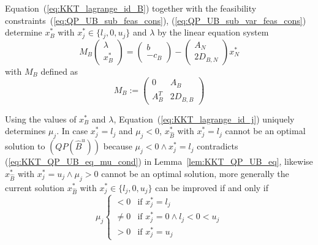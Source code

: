 \documentclass[a4paper]{article}
\begin{document}
Equation~(\ref{eq:KKT_lagrange_id_B}) together with the feasibility
constraints~(\ref{eq:QP_UB_sub_feas_cons}), (\ref{eq:QP_UB_sub_var_feas_cons})
determine $x_{B}^{*}$ with $x_{j}^{*} \in \{l_{j}, 0, u_{j}\}$ and $\lambda$ by
the linear equation system
\begin{equation}
M_{B}
\left(
\begin{array}{c}
\lambda \\
\hline
x_{B}^{*}
\end{array}
\right)
=
\left(
\begin{array}{c}
b \\
\hline
-c_{B}
\end{array}
\right)
-
\left(
\begin{array}{c}
A_{N} \\
\hline
2D_{B, N}
\end{array}
\right)
x_{N}^{*}
\end{equation}
with $M_{B}$ defined as
\begin{equation}
M_{B}:=
\left(
\begin{array}{c|c}
0 & A_{B} \\
\hline
A_{B}^{T} & 2D_{B,B}
\end{array}
\right)
\end{equation}

Using the values of $x_{B}^{*}$ and $\lambda$,
Equation~(\ref{eq:KKT_lagrange_id_j}) uniquely determines $\mu_{j}$.
In case $x_{j}^{*}=l_{j}$ and $\mu_{j} < 0$, $x_{\hat{B}}^{*}$ with
$x_{j}^{*}=l_{j}$ cannot
be an optimal solution to $(QP(\hat{B}^{u}))$ because
$\mu_{j}<0 \wedge x_{j}^{*}=l_{j}$ contradicts (\ref{eq:KKT_QP_UB_eq_mu_cond})
in Lemma~\ref{lem:KKT_QP_UB_eq}, likewise $x_{\hat{B}}^{*}$ with
$x_{j}^{*}=u_{j} \wedge \mu_{j}>0 $ cannot be an optimal solution, more
generally the current solution $x_{\hat{B}}^{*}$ with
$x_{j}^{*} \in \{l_{j}, 0, u_{j}\}$ can be improved if and only if
\begin{equation}
\mu_{j}
\left\{
\begin{array}{ll}
< 0    & \text{if $x_{j}^{*}=l_{j}$} \\
\neq 0 & \text{if $x_{j}^{*}=0 \wedge l_{j} < 0 < u_{j}$} \\
> 0    & \text{if $x_{j}^{*}=u_{j}$}
\end{array}
\right.
\end{equation}
\end{document}

